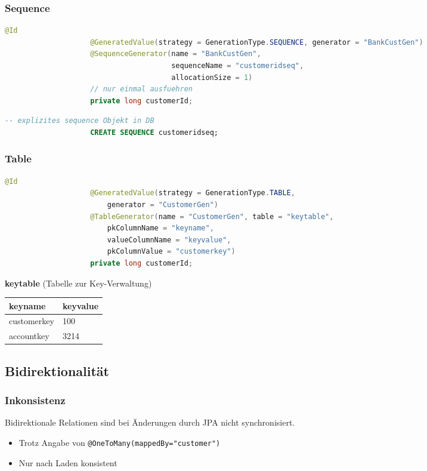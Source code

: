 \documentclass[a4paper, landscape, 8pt]{scrartcl}
\begin{document}
\begin{multicols*}{4}
        \subsubsection{Sequence}
        \begin{lstlisting}[language=java]
                    @Id
                    @GeneratedValue(strategy = GenerationType.SEQUENCE, generator = "BankCustGen")
                    @SequenceGenerator(name = "BankCustGen",
                                       sequenceName = "customeridseq",
                                       allocationSize = 1)
                    // nur einmal ausfuehren
                    private long customerId;
        \end{lstlisting}
        \begin{lstlisting}[language=sql]
                    -- explizites sequence Objekt in DB
                    CREATE SEQUENCE customeridseq;
        \end{lstlisting}

        \subsubsection{Table}
        \begin{lstlisting}[language=java]
                    @Id
                    @GeneratedValue(strategy = GenerationType.TABLE,
                        generator = "CustomerGen")
                    @TableGenerator(name = "CustomerGen", table = "keytable",
                        pkColumnName = "keyname",
                        valueColumnName = "keyvalue",
                        pkColumnValue = "customerkey")
                    private long customerId;
        \end{lstlisting}

        \textbf{keytable} (Tabelle zur Key-Verwaltung)\\
        \begin{tabularx}{\columnwidth}{l | X}
            \textbf{keyname} & \textbf{keyvalue} \\
            \hline
            customerkey & 100 \\
            \hline
            accountkey & 3214
        \end{tabularx}

        \subsection{Bidirektionalität}
        \subsubsection{Inkonsistenz}
        Bidirektionale Relationen sind bei Änderungen durch JPA nicht synchronisiert.
        \begin{itemize}
            \item Trotz Angabe von \texttt{@OneToMany(mappedBy="customer")}
            \item Nur nach Laden konsistent
        \end{itemize}


\end{multicols*}
\end{document}
